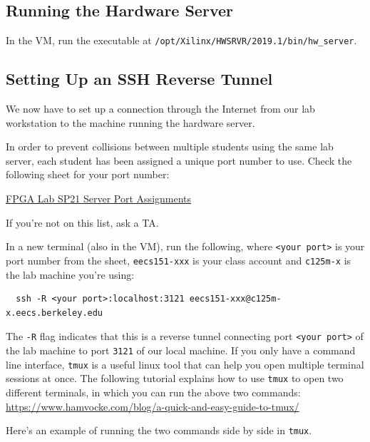\documentclass[11pt]{article}
\begin{document}
\subsection{Running the Hardware Server}

In the VM, run the executable at \verb|/opt/Xilinx/HWSRVR/2019.1/bin/hw_server|.

\subsection{Setting Up an SSH Reverse Tunnel}
We now have to set up a connection through the Internet from our lab workstation to the machine running the hardware server.

In order to prevent collisions between multiple students using the same lab server, each student has been assigned a unique port number to use. Check the following sheet for your port number:

\href{https://docs.google.com/spreadsheets/d/1BeXS-TKXfxFqZ8cCp3gJYv2zRsh1nRchLU5TO5UcIkc/edit?usp=sharing}{FPGA Lab SP21 Server Port Assignments}

If you're not on this list, ask a TA.

In a new terminal (also in the VM), run the following, where \texttt{<your port>} is your port number from the sheet, \texttt{eecs151-xxx} is your class account and \texttt{c125m-x} is the lab machine you're using:

\begin{verbatim}
  ssh -R <your port>:localhost:3121 eecs151-xxx@c125m-x.eecs.berkeley.edu
\end{verbatim}

The \texttt{-R} flag indicates that this is a reverse tunnel connecting port \texttt{<your port>} of the lab machine to port \texttt{3121} of our local machine. 
If you only have a command line interface, \texttt{tmux} is a useful linux tool that can help you open multiple terminal sessions at once. 
The following tutorial explains how to use \texttt{tmux} to open two different terminals, in which you can run the above two commands:
\url{https://www.hamvocke.com/blog/a-quick-and-easy-guide-to-tmux/}

Here's an example of running the two commands side by side in \texttt{tmux}.
\end{document}
